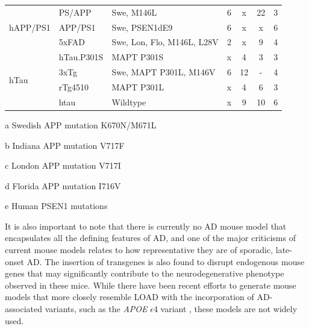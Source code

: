 \begin{table}[h]
\begin{threeparttable}
\begin{tabular}{@{}lllcccc@{}}
			\multirow{3}{*}{hAPP/PS1} & PS/APP & Swe\tnote{a}, M146L\tnote{e}                 & 6  & x  & 22    & 3                \\
			& APP/PS1         & Swe\tnote{a}, PSEN1dE9              & 6  & x  & x     & 6                \\
			& 5xFAD                 & Swe\tnote{a}, Lon\tnote{a}, Flo\tnote{c}, M146L\tnote{e}, L28V\tnote{e} & 2  & x  & 9     & 4                \\
			\multirow{4}{*}{hTau}     & hTau.P301S            & MAPT P301S                 & x  & 4  & 3     & 3                \\
			& 3xTg                  & Swe\tnote{a}, MAPT P301L, M146V     & 6  & 12 & -    & 4                \\
			& rTg4510               & MAPT P301L                 & x  & 4  & 6     & 3                \\
			& htau                  & Wildtype                   & x  & 9  & 10    & 6                \\ \cmidrule(l){1-7} 
		\end{tabular}
		\begin{tablenotes}
			\footnotesize
			\item[a] Swedish APP mutation K670N/M671L
			\item[b] Indiana APP mutation V717F
			\item[c] London APP mutation V717I
			\item[d] Florida APP mutation I716V 
			\item[e] Human PSEN1 mutations 
		\end{tablenotes}
	\end{threeparttable}
\end{table}

It is also important to note that there is currently no AD mouse model that encapsulates all the defining features of AD, and one of the major criticisms of current mouse models relates to how representative they are of sporadic, late-onset AD. The insertion of transgenes is also found to disrupt endogenous mouse genes that may significantly contribute to the neurodegenerative phenotype observed in these mice\cite{Gamache2019}. While there have been recent efforts to generate mouse models that more closely resemble LOAD with the incorporation of AD-associated variants, such as the \textit{APOE} $\epsilon$4 variant \cite{apoe4trem2_mousemodel,Lewandowski2020}, these models are not widely used. 

